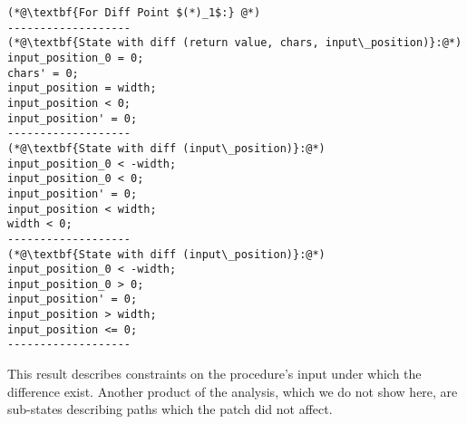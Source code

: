 \begin{lstlisting}
(*@\textbf{For Diff Point $(*)_1$:} @*)
-------------------
(*@\textbf{State with diff (return value, chars, input\_position)}:@*)
input_position_0 = 0;
chars' = 0;
input_position = width;
input_position < 0;
input_position' = 0;
-------------------
(*@\textbf{State with diff (input\_position)}:@*)
input_position_0 < -width;
input_position_0 < 0;
input_position' = 0;
input_position < width;
width < 0;
-------------------
(*@\textbf{State with diff (input\_position)}:@*)
input_position_0 < -width;
input_position_0 > 0;
input_position' = 0;
input_position > width;
input_position <= 0;
-------------------
\end{lstlisting}
This result describes constraints on the procedure's input under which the difference exist. Another product of the analysis, which we do not show here, are sub-states describing paths which the patch did not affect.

